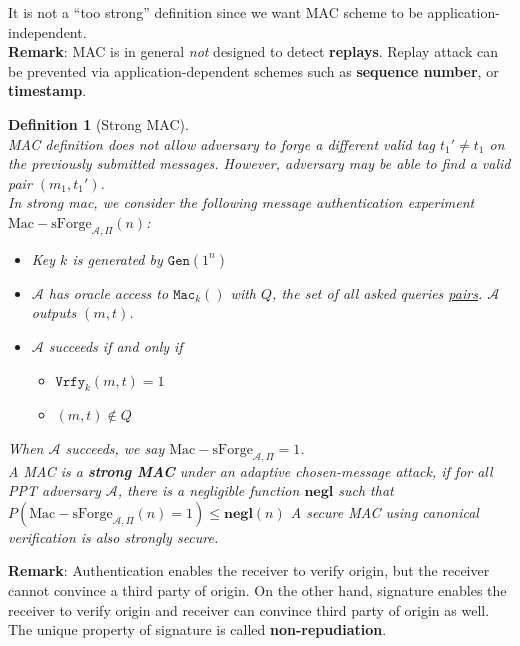 \documentclass[12pt]{article}
\newcommand\MacSForge{\mathrm{Mac-sForge}}
\newtheorem{definition}{Definition}[section]
\theoremstyle{definition}
\begin{document}
It is not a ``too strong'' definition since we want MAC scheme to be application-independent.\\
\textbf{Remark}: MAC is in general \textit{not} designed to detect \textbf{replays}. Replay attack can be prevented via application-dependent schemes such as \textbf{sequence number}, or \textbf{timestamp}.
\begin{definition}[Strong MAC]
\hfill\\\normalfont MAC definition does not allow adversary to forge a different valid tag $t_1'\neq t_1$ on the previously submitted messages. However, adversary may be able to find a valid pair $(m_1,t_1')$. \\
In strong mac, we consider the following message authentication experiment $\MacSForge_{\mathcal{A}, \Pi}(n)$:
\begin{itemize}
  \item Key $k$ is generated by $\texttt{Gen}(1^n)$
  \item $\mathcal{A}$ has oracle access to $\texttt{Mac}_k()$ with $Q$, the set of all asked queries \underline{pairs}. $\mathcal{A}$ outputs $(m,t)$.
  \item $\mathcal{A}$ succeeds if and only if 
  \begin{itemize}
    \item $\texttt{Vrfy}_k(m,t)=1$
    \item $(m,t)\not\in Q$
  \end{itemize}
\end{itemize}
When $\mathcal{A}$ succeeds, we say $\MacSForge_{\mathcal{A},\Pi}=1$.\\
A MAC is a \textbf{strong MAC} under an adaptive chosen-message attack, if for all PPT adversary $\mathcal{A}$, there is a negligible function $\mathbf{negl}$ such that
$
P(\MacSForge_{\mathcal{A},\Pi}(n)=1)\leq \mathbf{negl}(n)
$
A secure MAC using canonical verification is also strongly secure.
\end{definition}
\textbf{Remark}: Authentication enables the receiver to verify origin, but the receiver cannot convince a third party of origin. On the other hand, signature enables the receiver to verify origin and receiver can convince third party of origin as well. The unique property of signature is called \textbf{non-repudiation}.
\end{document}
